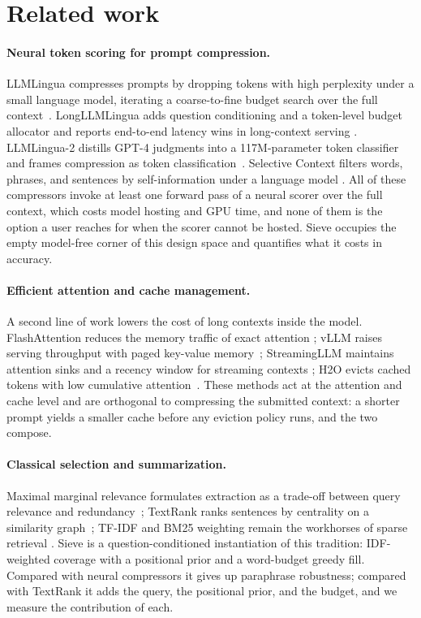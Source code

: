 \documentclass{article}
\newcommand{\method}{Sieve}
\begin{document}
\section{Related work}
\label{sec:related}

\paragraph{Neural token scoring for prompt compression.}
LLMLingua compresses prompts by dropping tokens with high perplexity
under a small language model, iterating a coarse-to-fine budget search
over the full context~\citep{jiang2023llmlingua}. LongLLMLingua adds
question conditioning and a token-level budget allocator and reports
end-to-end latency wins in long-context serving
\citep{jiang2023longllmlingua}. LLMLingua-2 distills GPT-4 judgments
into a 117M-parameter token classifier and frames compression as token
classification~\citep{pan2024llmlingua2}. Selective Context filters
words, phrases, and sentences by self-information under a language model
\citep{li2023selective}. All of these compressors invoke at least one
forward pass of a neural scorer over the full context, which costs model
hosting and GPU time, and none of them is the option a user reaches for
when the scorer cannot be hosted. \method{} occupies the empty model-free
corner of this design space and quantifies what it costs in accuracy.

\paragraph{Efficient attention and cache management.}
A second line of work lowers the cost of long contexts inside the model.
FlashAttention reduces the memory traffic of exact attention
\citep{dao2022flashattention}; vLLM raises serving throughput with
paged key-value memory~\citep{kwon2023vllm}; StreamingLLM maintains
attention sinks and a recency window for streaming contexts
\citep{xiao2023streaming}; H2O evicts cached tokens with low cumulative
attention~\citep{zhang2023h2o}. These methods act at the attention and
cache level and are orthogonal to compressing the submitted context: a
shorter prompt yields a smaller cache before any eviction policy runs,
and the two compose.

\paragraph{Classical selection and summarization.}
Maximal marginal relevance formulates extraction as a trade-off between
query relevance and redundancy~\citep{carbonell1998mmr}; TextRank ranks
sentences by centrality on a similarity graph~\citep{mihalcea2004textrank};
TF-IDF and BM25 weighting remain the workhorses of sparse retrieval
\citep{robertson2009bm25}. \method{} is a question-conditioned
instantiation of this tradition: IDF-weighted coverage with a positional
prior and a word-budget greedy fill. Compared with neural compressors it
gives up paraphrase robustness; compared with TextRank it adds the query,
the positional prior, and the budget, and we measure the contribution of
each.
\end{document}
